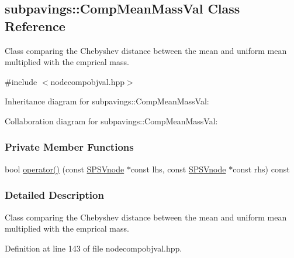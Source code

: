 \hypertarget{classsubpavings_1_1CompMeanMassVal}{\subsection{subpavings\-:\-:\-Comp\-Mean\-Mass\-Val \-Class \-Reference}
\label{classsubpavings_1_1CompMeanMassVal}
}


\-Class comparing the \-Chebyshev distance between the mean and uniform mean multiplied with the emprical mass.  




{\ttfamily \#include $<$nodecompobjval.\-hpp$>$}



\-Inheritance diagram for subpavings\-:\-:\-Comp\-Mean\-Mass\-Val\-:


\-Collaboration diagram for subpavings\-:\-:\-Comp\-Mean\-Mass\-Val\-:
\subsubsection*{\-Private \-Member \-Functions}
\begin{DoxyCompactItemize}
\item 
bool \hyperlink{classsubpavings_1_1CompMeanMassVal_a29140c1748d76b0ec8df744143d85ee7}{operator()} (const \hyperlink{classsubpavings_1_1SPSVnode}{\-S\-P\-S\-Vnode} $\ast$const lhs, const \hyperlink{classsubpavings_1_1SPSVnode}{\-S\-P\-S\-Vnode} $\ast$const rhs) const 
\end{DoxyCompactItemize}


\subsubsection{\-Detailed \-Description}
\-Class comparing the \-Chebyshev distance between the mean and uniform mean multiplied with the emprical mass. 

\-Definition at line 143 of file nodecompobjval.\-hpp.



